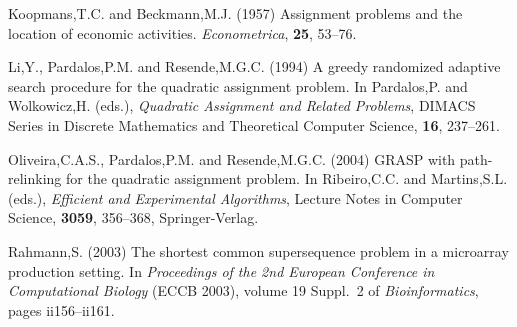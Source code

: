 \documentclass{bioinfo}
\begin{document}
\begin{thebibliography}{}
 Koopmans,T.C. and Beckmann,M.J. (1957) Assignment problems and the location of economic activities. {\it Econometrica}, {\bf 25}, 53--76.

 Li,Y., Pardalos,P.M. and Resende,M.G.C. (1994) A greedy randomized adaptive search procedure for the quadratic assignment problem. In Pardalos,P. and Wolkowicz,H. (eds.), {\it Quadratic Assignment and Related Problems}, DIMACS Series in Discrete Mathematics and Theoretical Computer Science, {\bf 16}, 237--261.

 Oliveira,C.A.S., Pardalos,P.M. and Resende,M.G.C. (2004) GRASP with path-relinking for the quadratic assignment problem. In Ribeiro,C.C. and Martins,S.L. (eds.), {\it Efficient and Experimental Algorithms}, Lecture Notes in Computer Science, {\bf 3059}, 356--368, Springer-Verlag.

Rahmann,S. (2003) The shortest common supersequence problem in a microarray production setting.
In {\it Proceedings of the 2nd European Conference in Computational Biology} ({ECCB} 2003), volume 19 Suppl.~2 of {\it Bioinformatics}, pages ii156--ii161.

\end{thebibliography}
\end{document}
